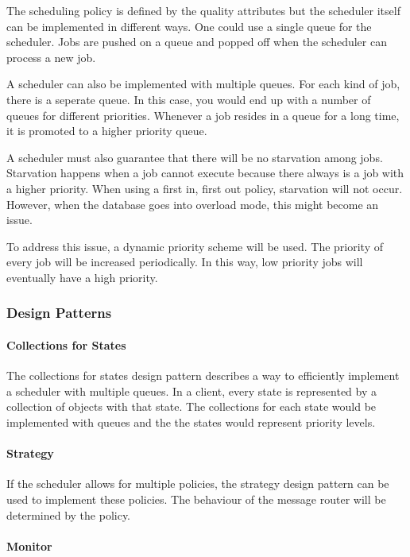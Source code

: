\npar The scheduling policy is defined by the quality attributes but the
scheduler itself can be implemented in different ways. One could use a single
queue for the scheduler. Jobs are pushed on a queue and popped off when the
scheduler can process a new job. 

\npar A scheduler can also be implemented with multiple queues. For each kind of
job, there is a seperate queue. In this case, you would end up with a number of
queues for different priorities. Whenever a job resides in a queue for a long
time, it is promoted to a higher priority queue. 

\npar A scheduler must also guarantee that there will be no starvation among
jobs. Starvation happens when a job cannot execute because there always is a
job with a higher priority. When using a first in, first out policy, starvation
will not occur. However, when the database goes into overload mode, this might
become an issue. 

\npar To address this issue, a dynamic priority scheme will be used. The
priority of every job will be increased periodically. In this way, low priority
jobs will eventually have a high priority. 

\subsubsection{Design Patterns}
\label{add:it3/patterns}

\paragraph{Collections for States}

\npar The collections for states design pattern describes a way to efficiently
implement a scheduler with multiple queues. In a client, every state is
represented by a collection of objects with that state. The collections for
each state would be implemented with queues and the the states would represent
priority levels.

\paragraph{Strategy}

\npar If the scheduler allows for multiple policies, the strategy design pattern
can be used to implement these policies. The behaviour of the message router
will be determined by the policy.

\paragraph{Monitor} 

